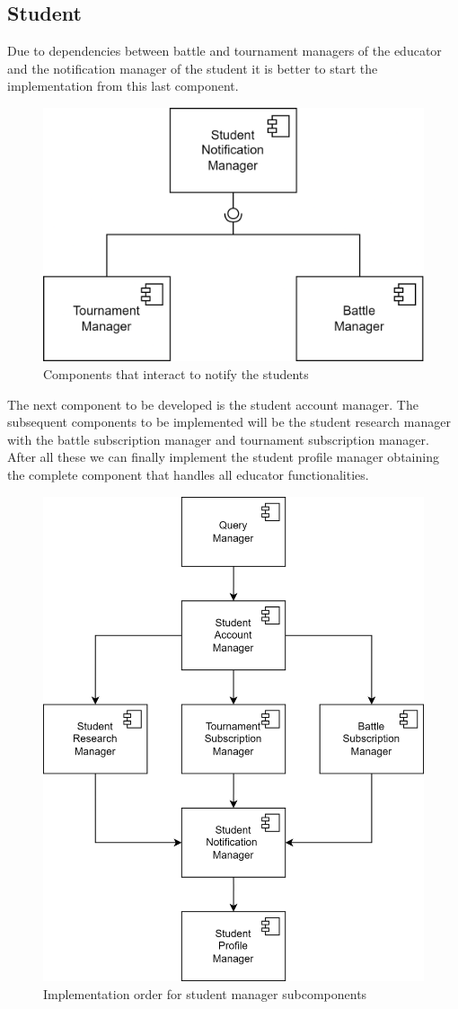 \documentclass[12pt, a4paper]{report}
\begin{document}
    \subsection{Student}
    Due to dependencies between battle and tournament managers of the educator and the notification manager of the student it is better to start the implementation from this last component.
    \begin{figure}[H]
        \centering
        \includegraphics[width=0.5\linewidth]{images/notifications.png}
        \caption{Components that interact to notify the students}
    \end{figure}
    The next component to be developed is the student account manager. 
    The subsequent components to be implemented will be the student research manager with the battle subscription manager and tournament subscription manager. 
    After all these we can finally implement the student profile manager obtaining the complete component that handles all educator functionalities. 
    \begin{figure}[H]
        \centering
        \includegraphics[width=0.5\linewidth]{images/student_impl.png}
        \caption{Implementation order for student manager subcomponents}
    \end{figure}
\end{document}
